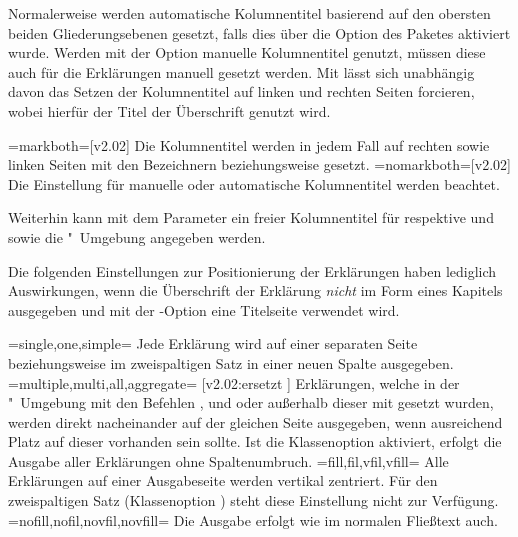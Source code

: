 \begin{DeclareEntity*}{}
\begin{DeclareEntity*}{}
\begin{DeclareEntity*}{}
\begin{Declaration}
Normalerweise werden automatische Kolumnentitel basierend auf den obersten 
beiden Gliederungsebenen gesetzt, falls dies über die Option  
des Paketes  aktiviert wurde. Werden mit der Option 
 manuelle Kolumnentitel genutzt, müssen diese auch für die 
Erklärungen manuell gesetzt werden. Mit  lässt 
sich unabhängig davon das Setzen der Kolumnentitel auf linken und rechten 
Seiten forcieren, wobei hierfür der Titel der Überschrift genutzt wird.%
%
\begin{DeclareValues}
\itemval=markboth=[v2.02]
  Die Kolumnentitel werden in jedem Fall auf rechten sowie linken Seiten mit 
  den Bezeichnern  beziehungsweise  
  gesetzt.
\itemval=nomarkboth=[v2.02]
  Die Einstellung für manuelle oder automatische Kolumnentitel werden beachtet.
\end{DeclareValues}

Weiterhin kann mit dem Parameter  ein 
freier Kolumnentitel für  respektive  
und  sowie die "~Umgebung angegeben 
werden.

Die folgenden Einstellungen zur Positionierung der Erklärungen haben lediglich 
Auswirkungen, wenn die Überschrift der Erklärung \emph{nicht} im Form eines 
Kapitels ausgegeben und mit der \KOMAScript-Option  eine 
Titelseite verwendet wird.
\begin{DeclareValues}
\itemval=single,one,simple=
  Jede Erklärung wird auf einer separaten Seite
  beziehungsweise im zweispaltigen Satz in einer neuen Spalte ausgegeben.
\itemval=multiple,multi,all,aggregate=%
    [v2.02:ersetzt ]
  Erklärungen, welche in der "~Umgebung mit den 
  Befehlen ,  und  oder 
  außerhalb dieser mit  gesetzt wurden, werden direkt 
  nacheinander auf der gleichen Seite ausgegeben, wenn ausreichend Platz auf 
  dieser vorhanden sein sollte. Ist die Klassenoption  
  aktiviert, erfolgt die Ausgabe aller Erklärungen ohne Spaltenumbruch.
\itemval=fill,fil,vfil,vfill=
  Alle Erklärungen auf einer Ausgabeseite werden vertikal zentriert. Für 
  den zweispaltigen Satz (Klassenoption ) steht diese 
  Einstellung nicht zur Verfügung.
\itemval=nofill,nofil,novfil,novfill=
  Die Ausgabe erfolgt wie im normalen Fließtext auch.
\end{DeclareValues}
\end{Declaration}


\end{DeclareEntity*}
\end{DeclareEntity*}
\end{DeclareEntity*}
